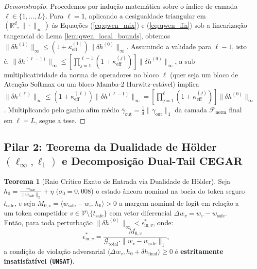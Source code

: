 \documentclass[11pt,a4paper]{article}
\theoremstyle{definition}
\newtheorem{theorem}{Teorema}
\begin{document}
\begin{proof}[Demonstração]
Procedemos por indução matemática sobre o índice de camada $\ell \in \{1, \dots, L\}$. Para $\ell = 1$, aplicando a desigualdade triangular em $(\mathbb{R}^d, \|\cdot\|_\infty)$ às Equações (\ref{eq:qwen_mix}) e (\ref{eq:qwen_ffn}) sob a linearização tangencial do Lema \ref{lem:qwen_local_bounds}, obtemos $\|\delta h^{(1)}\|_\infty \le (1 + \kappa_{\text{eff}}^{(1)})\|\delta h^{(0)}\|_\infty$. Assumindo a validade para $\ell - 1$, isto é, $\|\delta h^{(\ell-1)}\|_\infty \le \left[\prod_{j=1}^{\ell-1}(1+\kappa_{\text{eff}}^{(j)})\right]\|\delta h^{(0)}\|_\infty$, a sub-multiplicatividade da norma de operadores no bloco $\ell$ (quer seja um bloco de Atenção Softmax ou um bloco Mamba-2 Hurwitz-estável) implica $\|\delta h^{(\ell)}\|_\infty \le (1+\kappa_{\text{eff}}^{(\ell)})\|\delta h^{(\ell-1)}\|_\infty = \left[\prod_{j=1}^{\ell}(1+\kappa_{\text{eff}}^{(j)})\right]\|\delta h^{(0)}\|_\infty$. Multiplicando pelo ganho afim médio $\bar{\gamma}_{\text{out}} = \frac{1}{d}\|\gamma_{\text{out}}\|_1$ da camada $\mathcal{F}_{\text{norm}}$ final em $\ell = L$, segue a tese.
\end{proof}

\subsection{Pilar 2: Teorema da Dualidade de Hölder \texorpdfstring{$(\ell_\infty, \ell_1)$}{(l-inf, l-1)} e Decomposição Dual-Tail CEGAR}

\begin{theorem}[Raio Crítico Exato de Entrada via Dualidade de Hölder]
\label{thm:qwen_holder}
Seja $h_0 = \frac{w_{\text{safe}}}{\|w_{\text{safe}}\|_2} + \eta$ ($\sigma_0 = 0{,}008$) o estado âncora nominal na bacia do token seguro $t_{\text{safe}}$, e seja $M_{0,v} = \langle w_{\text{safe}} - w_v, h_0 \rangle > 0$ a margem nominal de logit em relação a um token competidor $v \in \mathcal{V} \setminus \{t_{\text{safe}}\}$ com vetor diferencial $\Delta w_v = w_v - w_{\text{safe}}$. Então, para toda perturbação $\|\delta h^{(0)}\|_\infty < \epsilon_{\text{in},v}^*$, onde:
\begin{equation}
    \epsilon_{\text{in},v}^* = \frac{M_{0,v}}{\mathcal{G}_{\text{total}} \cdot \|w_v - w_{\text{safe}}\|_1},
\end{equation}
a condição de violação adversarial $\langle \Delta w_v, h_0 + \delta h_{\text{final}} \rangle \ge 0$ é \textbf{estritamente insatisfatível (\texttt{UNSAT})}.
\end{theorem}
\end{document}
